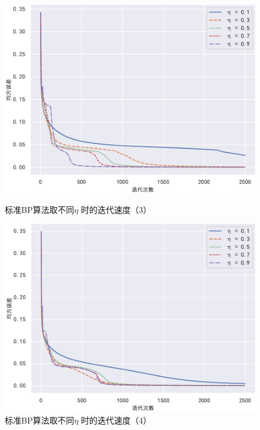 \documentclass{ctexart}
\begin{document}
\begin{figure}[!htb]
		\begin{minipage}{0.49\linewidth}
			\centering
			\includegraphics[width=\textwidth]{../image/标准BP抖动3.pdf}
			\caption{标准BP算法取不同$\eta$ 时的迭代速度（3）}
			\label{标准3}%
		\end{minipage}
		\begin{minipage}{0.49\linewidth}
			\centering
			\includegraphics[width=\textwidth]{../image/标准BP抖动4.pdf}
			\caption{标准BP算法取不同$\eta$ 时的迭代速度（4）}
			\label{标准4}%
		\end{minipage}
	\end{figure}
\end{document}
